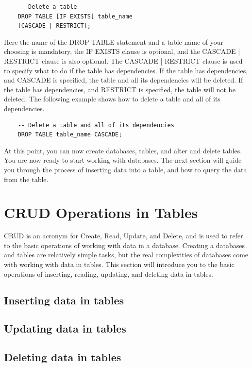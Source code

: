 \begin{verbatim}
    -- Delete a table
    DROP TABLE [IF EXISTS] table_name 
    [CASCADE | RESTRICT];
\end{verbatim}

Here the name of the DROP TABLE statement and a table name of your choosing is mandatory, the IF EXISTS clause is optional, and the CASCADE | RESTRICT clause is also optional. The CASCADE | RESTRICT clause is used to specify what to do if the table has dependencies. If the table has dependencies, and CASCADE is specified, the table and all its dependencies will be deleted. If the table has dependencies, and RESTRICT is specified, the table will not be deleted. The following example shows how to delete a table and all of its dependencies.

\begin{verbatim}
    -- Delete a table and all of its dependencies
    DROP TABLE table_name CASCADE;
\end{verbatim}

At this point, you can now create databases, tables, and alter and delete tables. You are now ready to start working with databases. The next section will guide you through the process of inserting data into a table, and how to query the data from the table.

\section{CRUD Operations in Tables}
CRUD is an acronym for Create, Read, Update, and Delete, and is used to refer to the basic operations of working with data in a database. Creating a databases and tables are relatively simple tasks, but the real complexities of databases come with working with data in tables. This section will introduce you to the basic operations of inserting, reading, updating, and deleting data in tables. 

\subsection{Inserting data in tables}
\subsection{Updating data in tables}
\subsection{Deleting data in tables}
